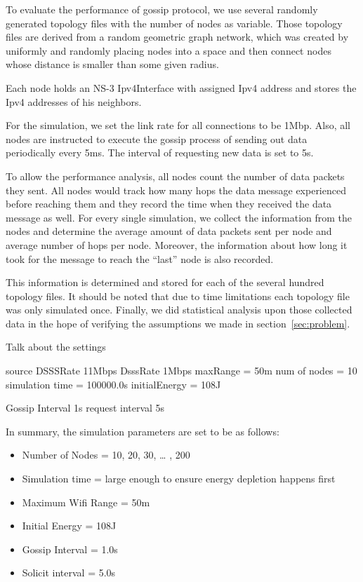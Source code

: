  

To evaluate the performance of gossip protocol, we use several randomly generated topology files with the number of nodes as variable. Those topology files are derived from a random geometric graph network, which was created by uniformly and randomly placing nodes into a space and then connect nodes whose distance is smaller than some given radius.



Each node holds an NS-3 Ipv4Interface with assigned Ipv4 address and stores the Ipv4 addresses of his neighbors.

For the simulation, we set the link rate for all connections to be 1Mbp. Also, all nodes are instructed to execute the gossip process of sending out data periodically every 5ms. The interval of requesting new data is set to 5s.

To allow the performance analysis, all nodes count the number of data packets they sent. All nodes would track how many hops the data message experienced before reaching them and they record the time when they received the data message as well. For every single simulation, we collect the information from the nodes and determine the average amount of data packets sent per node and average number of hops per node. Moreover, the information about how long it took for the message to reach the ``last'' node is also recorded.

This information is determined and stored for each of the several hundred topology files. It should be noted that due to time limitations each topology file was only simulated once. Finally, we did statistical analysis upon those collected data in the hope of verifying the assumptions we made in section~\ref{sec:problem}.

Talk about the settings


source DSSSRate 11Mbps
DsssRate 1Mbps
maxRange = 50m
num of nodes = 10
simulation time = 100000.0s
initialEnergy = 108J

Gossip Interval 1s
request interval 5s

In summary, the simulation parameters are set to be as follows:
\begin{itemize}
	\item Number of Nodes = 10, 20, 30, … , 200
	\item Simulation time = large enough to ensure energy depletion happens first
	\item Maximum Wifi Range = 50m
	\item Initial Energy = 108J
	\item Gossip Interval = 1.0s
	\item Solicit interval = 5.0s 
\end{itemize}

